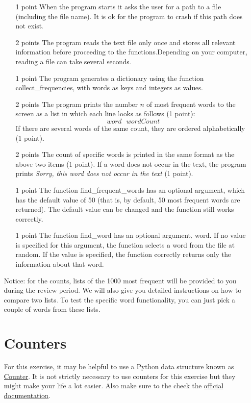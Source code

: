 \documentclass[11pt, a4paper]{article}
\begin{document}
\begin{itemize}
\item[1 point] When the program starts it asks the user for a path to a file (including the file name). It is ok for the program to crash if this path does not exist.
\item[2 points] The program reads the text file only once and stores all relevant information before proceeding to the functions.Depending on your computer, reading a file can take several seconds.
\item[1 point] The program generates a dictionary using the function collect\_frequencies, with words as keys and integers as values.
\item[2 points] The program prints the number $n$ of most frequent words to the screen as a list in which each line looks as follows (1 point):
$$ word~~~wordCount $$
If there are several words of the same count, they are ordered alphabetically (1 point).
\item[2 points] The count of specific words is printed in the same format as the above two items (1 point). If a word does not occur in the text, the program prints \textit{Sorry, this
word does not occur in the text} (1 point).
\item[1 point] The function find\_frequent\_words has an optional argument, which has the default value of 50 (that is, by default, 50 most frequent words are returned). The default value can be changed and the function still works correctly.
\item[1 point] The function find\_word has an optional argument, word. If no value is specified for this argument, the function selects a word from the file at random. If the value is specified, the function correctly returns only the information about that word.
\end{itemize}

Notice: for the counts, lists of the 1000 most frequent will be provided to you during the review period. We will also give
you detailed instructions on how to compare two lists. To test the specific word functionality, you can just pick a couple of words from these lists.

\enlargethispage{1cm}
\section{Counters}
For this exercise, it may be helpful to use a Python data structure known as 
\href{https://pymotw.com/3/collections/counter.html}{Counter}. It is not strictly necessary to use counters
for this exercise but they might make your life a lot easier. Also make sure to the check the
\href{https://docs.python.org/3/library/collections.html#collections.Counter}{official documentation}.
\end{document}
